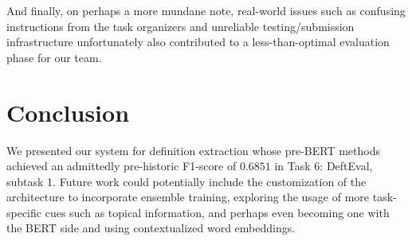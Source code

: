 \documentclass[11pt]{article}
\begin{document}
And finally, on perhaps a more mundane note, real-world issues such as confusing instructions from the task organizers and
unreliable testing/submission infrastructure unfortunately also contributed to a less-than-optimal evaluation phase for our team.


\section{Conclusion}
We presented our system for definition extraction whose pre-BERT methods achieved an admittedly pre-historic F1-score of $0.6851$ in
Task 6: DeftEval, subtask 1. Future work could potentially include the customization of the architecture to incorporate ensemble training,
exploring the usage of more task-specific cues such as topical information, and perhaps even becoming one with the BERT side and using contextualized word embeddings.

\newpage


\end{document}

